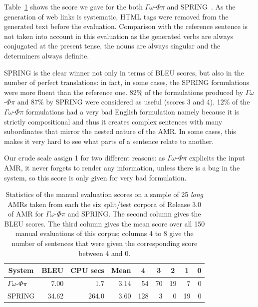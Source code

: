 \documentclass[12pt]{article}
\newcommand{\systeme}[1]{\textsc{#1}}
\newcommand{\gophipy}{$\Gamma\omega$-$\Phi\pi$}
\newcommand{\spring}{\systeme{SPRING}}
\newcommand{\representation}[1]{\textsf{#1}}
\newcommand{\AMR}{\representation{AMR}}
\begin{document}
Table~\ref{tab:eval-statistics} shows the score we gave for the both \gophipy{} and \spring{}~\cite{bevilacqua-etal-2021-one}. As the generation of web links is systematic, HTML tags were removed from the generated text before the evaluation. Comparison with the reference sentence is not taken into account in this evaluation as the generated verbs are always conjugated at the present tense, the nouns are always singular and the determiners always definite. 

\spring{} is the clear winner not only in terms of BLEU scores, but also in the number of perfect translations: in fact, in some cases, the \spring{} formulations were more fluent than the reference one. 82\% of the formulations produced by \gophipy{} and 87\% by \spring{} were considered as useful (scores 3 and 4). 12\% of the \gophipy{} formulations had a very bad English formulation namely because it is strictly compositional and thus it creates complex sentences with many subordinates that mirror the nested nature of the \AMR{}. In some cases, this makes it very hard to see what parts of a sentence relate to another.

Our crude scale assign 1 for two different reasons: as \gophipy{} explicits the input \AMR{}, it never forgets to render any information, unless there is a bug in the system, so this score is only given for very bad formulation. 
\begin{table}[ht]
\centering
\begin{tabular}{|l|r|r|r|rrrrr|}
\hline
\multicolumn{1}{|c}{System}&
\multicolumn{1}{|c|}{BLEU}&
\multicolumn{1}{|c}{CPU secs}&
\multicolumn{1}{|c}{Mean}&
\multicolumn{1}{|c}{4} &
\multicolumn{1}{c}{3} &
\multicolumn{1}{c}{2} &
\multicolumn{1}{c}{1} &
\multicolumn{1}{c|}{0} \\
\hline
\gophipy{} &  7.00 &   1.7 & 3.14 &  54 & 70 & 19 &  7 & 0 \\
\spring{}  & 34.62 & 264.0 & 3.60 & 128 &  3 &  0 & 19 & 0 \\
\hline
\end{tabular}
\caption{Statistics of the manual evaluation scores on a sample of 25 \emph{long} AMRs taken from each the six split/test corpora of Release 3.0 of AMR for \gophipy{} and \spring{}. The second column gives the BLEU scores. The third column gives the mean score over all 150 manual evaluations of this corpus; columns 4 to 8 give the number of sentences that were given the corresponding score between 4 and 0.}
\label{tab:eval-statistics}
\end{table}
\end{document}
